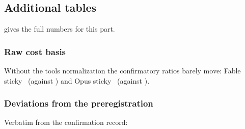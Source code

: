 \subsection{Additional tables}\label{vt:app:tables}

\begin{table}[tbp]
\centering\small
\caption{Savings-model check by arm and host, test split: prediction-interval coverage and the observed total
saving against its predicted 90\,\% interval.}
\label{vt:tab:modelcheck}

\end{table}

\begin{table}[tbp]
\centering\small
\caption{A/A noise floor: second plain-host session against the first. ``SD'' is the standard deviation of
the log ratio per pair and per single session.}
\label{vt:tab:aa}

\end{table}

 gives the full numbers for this part.

\begin{table}[tbp]
\centering\small
\caption{Interim and final cost ratios behind \cref{vt:fig:interim}.}
\label{vt:tab:interim}

\end{table}

\begin{table}[tbp]
\centering\small
\caption{Cost ratio by pause pattern, all splits (95\,\% CI). Exploratory.}
\label{vt:tab:slicegap}

\end{table}

\begin{table}[tbp]
\centering\small
\caption{Cost ratio by scripted session length, all splits (95\,\% CI). Exploratory.}
\label{vt:tab:sliceturns}

\end{table}

\subsubsection*{Raw cost basis}\label{vt:sec:rawbasis}
Without the tools normalization the confirmatory ratios barely move: Fable sticky \RawFableSticky\ (against
\CfFableStickyPair) and Opus sticky \RawOpusSticky\ (against \CfOpusStickyPair).

\subsubsection*{Deviations from the preregistration}\label{vt:sec:deviations}
Verbatim from the confirmation record:
{\small}

